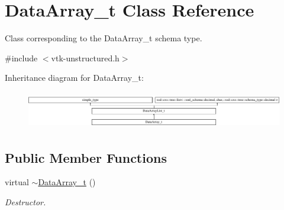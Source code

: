 \hypertarget{classDataArray__t}{}\section{Data\+Array\+\_\+t Class Reference}
\label{classDataArray__t}


Class corresponding to the Data\+Array\+\_\+t schema type.  




{\ttfamily \#include $<$vtk-\/unstructured.\+h$>$}

Inheritance diagram for Data\+Array\+\_\+t\+:\begin{figure}[H]
\begin{center}
\leavevmode
\includegraphics[height=1.660079cm]{classDataArray__t}
\end{center}
\end{figure}
\subsection*{Public Member Functions}
\begin{DoxyCompactItemize}
\item 
virtual \hyperlink{classDataArray__t_ac9806a5eedf7abecd7adf6408c8af894}{$\sim$\+Data\+Array\+\_\+t} ()
\begin{DoxyCompactList}\small\item\em Destructor. \end{DoxyCompactList}\end{DoxyCompactItemize}
